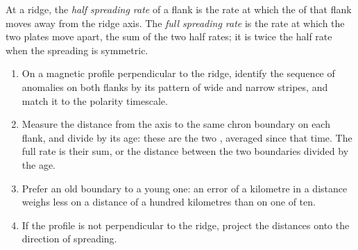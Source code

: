 \begin{omfigure}
\par{}
\label{fig:b1:plate-kinematics:stripes}
\end{omfigure}

\begin{definition}\label{def:b1:plate-kinematics:spreading-rate}
At a ridge, the \emph{half spreading rate} of a
flank is the rate at which the  of that flank moves away from the ridge
axis. The \emph{full spreading rate} is the rate at
which the two plates move apart, the sum of the two half rates; it is twice the
half rate when the spreading is symmetric.
\end{definition}

\begin{method}\label{met:b1:plate-kinematics:rate}
\begin{enumerate}
  \item On a magnetic profile perpendicular to the ridge, identify the sequence
        of anomalies on both flanks by its pattern of wide and narrow stripes,
        and match it to the polarity timescale.
  \item Measure the distance from the axis to the same chron boundary on each
        flank, and divide by its age: these are the two ,
        averaged since that time. The full rate is their sum, or the distance
        between the two boundaries divided by the age.
  \item Prefer an old boundary to a young one: an error of a kilometre in a
        distance weighs less on a distance of a hundred kilometres than on one
        of ten.
  \item If the profile is not perpendicular to the ridge, project the distances
        onto the direction of spreading.
\end{enumerate}
\end{method}

